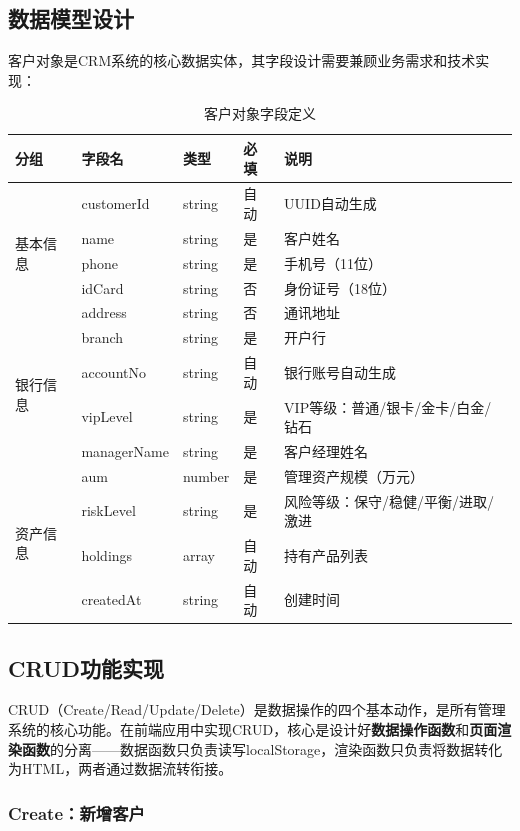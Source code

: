 \subsection{数据模型设计}

客户对象是CRM系统的核心数据实体，其字段设计需要兼顾业务需求和技术实现：

\begin{table}[H]
\centering
\small
\begin{tabular}{llllp{4cm}}
\toprule
\textbf{分组} & \textbf{字段名} & \textbf{类型} & \textbf{必填} & \textbf{说明} \\
\midrule
\multirow{5}{*}{基本信息} & customerId & string & 自动 & UUID自动生成 \\
 & name & string & 是 & 客户姓名 \\
 & phone & string & 是 & 手机号（11位） \\
 & idCard & string & 否 & 身份证号（18位） \\
 & address & string & 否 & 通讯地址 \\
\midrule
\multirow{4}{*}{银行信息} & branch & string & 是 & 开户行 \\
 & accountNo & string & 自动 & 银行账号自动生成 \\
 & vipLevel & string & 是 & VIP等级：普通/银卡/金卡/白金/钻石 \\
 & managerName & string & 是 & 客户经理姓名 \\
\midrule
\multirow{4}{*}{资产信息} & aum & number & 是 & 管理资产规模（万元） \\
 & riskLevel & string & 是 & 风险等级：保守/稳健/平衡/进取/激进 \\
 & holdings & array & 自动 & 持有产品列表 \\
 & createdAt & string & 自动 & 创建时间 \\
\bottomrule
\end{tabular}
\caption{客户对象字段定义}
\end{table}

\subsection{CRUD功能实现}

CRUD（Create/Read/Update/Delete）是数据操作的四个基本动作，是所有管理系统的核心功能。在前端应用中实现CRUD，核心是设计好\textbf{数据操作函数}和\textbf{页面渲染函数}的分离——数据函数只负责读写localStorage，渲染函数只负责将数据转化为HTML，两者通过数据流转衔接。

\subsubsection{Create：新增客户}

